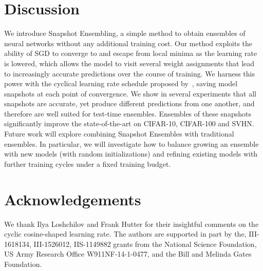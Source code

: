 \section{Discussion}

We introduce Snapshot Ensembling, a simple method to obtain ensembles of neural networks without any additional training cost. 
Our method exploits the ability of SGD to converge to and escape from local minima as the learning rate is lowered, which allows the model to visit several weight assignments that lead to increasingly accurate predictions over the course of training. We harness this power with the cyclical learning rate schedule proposed by~\citet{loshchilov2016sgdr}, saving model snapshots at each point of convergence. We show in several experiments that all snapshots are accurate, yet produce different predictions from one another, and therefore are well suited for test-time ensembles.
Ensembles of these snapshots significantly improve the state-of-the-art on CIFAR-10, CIFAR-100 and SVHN.
Future work will explore combining Snapshot Ensembles with traditional ensembles. 
In particular, we will investigate how to balance growing an ensemble with new models (with random initializations) and refining existing models with further training cycles under a fixed training budget.

\section*{Acknowledgements}

We thank Ilya Loshchilov and Frank Hutter for their insightful comments on the cyclic cosine-shaped learning rate. The authors are supported in part by the, III-1618134, III-1526012, IIS-1149882 grants from the National Science Foundation, US Army Research Office W911NF-14-1-0477, and the Bill and Melinda Gates Foundation. 

